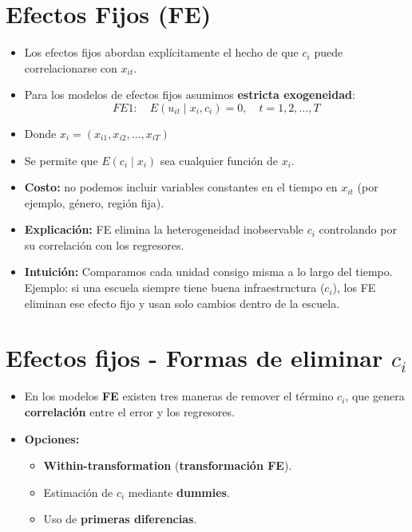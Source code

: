 \documentclass[12pt]{article}
\begin{document}
\section*{\noindent\textbf{Efectos Fijos (FE)}}

\begin{itemize}
    \item Los efectos fijos abordan explícitamente el hecho de que $c_i$ puede correlacionarse con $x_{it}$.
    \item Para los modelos de efectos fijos asumimos \textbf{estricta exogeneidad}:
    \[
    FE1: \quad E(u_{it} \mid x_i, c_i) = 0, \quad t=1,2,\ldots,T
    \]
    \item Donde $x_i = (x_{i1},x_{i2},\ldots,x_{iT})$
    \item Se permite que $E(c_i \mid x_i)$ sea cualquier función de $x_i$.
    \item \textbf{Costo:} no podemos incluir variables constantes en el tiempo en $x_{it}$ (por ejemplo, género, región fija).
\end{itemize}

\begin{itemize}
    \item \textbf{Explicación:} FE elimina la heterogeneidad inobservable $c_i$ controlando por su correlación con los regresores.
    \item \textbf{Intuición:} Comparamos cada unidad consigo misma a lo largo del tiempo. 
    Ejemplo: si una escuela siempre tiene buena infraestructura ($c_i$), los FE eliminan ese efecto fijo y usan solo cambios dentro de la escuela.
\end{itemize}

\section*{\noindent\textbf{Efectos fijos - Formas de eliminar $c_i$}}

\begin{itemize}
    \item En los modelos \textbf{FE} existen tres maneras de remover el término $c_i$, 
    que genera \textbf{correlación} entre el error y los regresores.
    \item \textbf{Opciones:}
    \begin{itemize}
        \item \textbf{Within-transformation} (\textbf{transformación FE}).
        \item Estimación de $c_i$ mediante \textbf{dummies}.
        \item Uso de \textbf{primeras diferencias}.
    \end{itemize}
\end{itemize}
\end{document}
